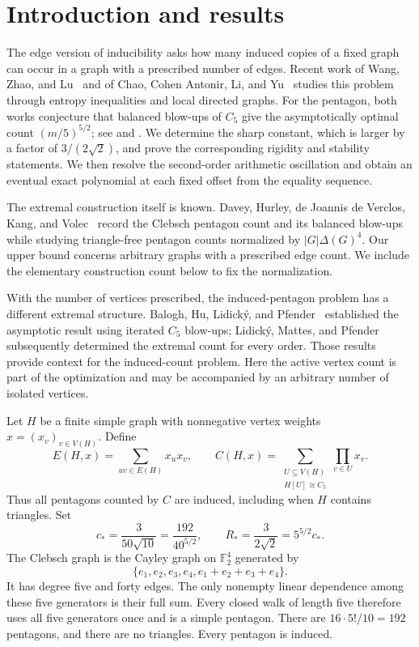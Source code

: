\section{Introduction and results}

The edge version of inducibility asks how many induced copies of a fixed
graph can occur in a graph with a prescribed number of edges. Recent work
of Wang, Zhao, and Lu~\cite{Wang2026} and of Chao, Cohen Antonir, Li, and
Yu~\cite{Chao2025} studies this problem through entropy inequalities and
local directed graphs. For the pentagon, both works conjecture that balanced
blow-ups of \(C_5\) give the asymptotically optimal count
\((m/5)^{5/2}\); see \cite[Conjecture~8]{Wang2026} and
\cite[Conjecture~1.7]{Chao2025}. We determine the sharp constant, which is
larger by a factor of \(3/(2\sqrt{2})\), and prove the corresponding rigidity
and stability statements. We then resolve the second-order arithmetic
oscillation and obtain an eventual exact polynomial at each fixed offset
from the equality sequence.

The extremal construction itself is known. Davey, Hurley, de Joannis de
Verclos, Kang, and Volec~\cite[Lemmas~1.4, 7.1, and 7.2]{Davey2026} record
the Clebsch pentagon count and its balanced blow-ups while studying
triangle-free pentagon counts normalized by \(|G|\Delta(G)^4\). Our upper
bound concerns arbitrary graphs with a prescribed edge count. We include
the elementary construction count below to fix the normalization.

With the number of vertices prescribed, the induced-pentagon problem has
a different extremal structure. Balogh, Hu, Lidick\'y, and
Pfender~\cite{Balogh2016} established the asymptotic result using iterated
\(C_5\) blow-ups; Lidick\'y, Mattes, and Pfender~\cite{Lidicky2023}
subsequently determined the extremal count for every order. Those results
provide context for the induced-count problem. Here the active vertex count
is part of the optimization and may be accompanied by an arbitrary number
of isolated vertices.

Let \(H\) be a finite simple graph with nonnegative vertex weights
\(x=(x_v)_{v\in V(H)}\). Define
\[
 E(H,x)=\sum_{uv\in E(H)}x_ux_v,\qquad
 C(H,x)=\sum_{\substack{U\subseteq V(H)\\ H[U]\cong C_5}}
                  \prod_{v\in U}x_v .
\]
Thus all pentagons counted by \(C\) are induced, including when \(H\)
contains triangles. Set
\[
 c_*=\frac{3}{50\sqrt{10}}=\frac{192}{40^{5/2}},
 \qquad
 R_*=\frac{3}{2\sqrt{2}}=5^{5/2}c_*.
\]
The Clebsch graph is the Cayley graph on \(\mathbb F_2^4\) generated by
\[
 \{e_1,e_2,e_3,e_4,e_1+e_2+e_3+e_4\}.
\]
It has degree five and forty edges. The only nonempty linear dependence
among these five generators is their full sum. Every closed walk of length
five therefore uses all five generators once and is a simple pentagon.
There are \(16\cdot 5!/10=192\) pentagons, and there are no triangles.
Every pentagon is induced.

